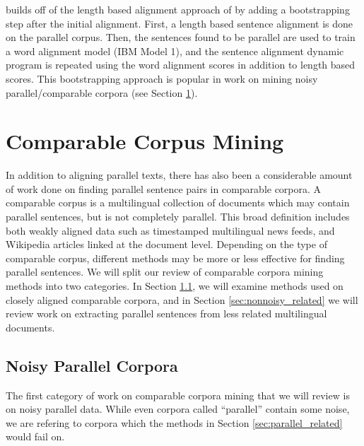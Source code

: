\citet{Moore02} builds off of the length based alignment approach of
\citet{Gale93} by adding a bootstrapping step after the initial alignment.
First, a length based sentence alignment is done on the parallel corpus. Then,
the sentences found to be parallel are used to train a word alignment model
(IBM Model 1), and the sentence alignment dynamic program is repeated using
the word alignment scores in addition to length based scores. This bootstrapping
approach is popular in work on mining noisy parallel/comparable corpora (see
Section \ref{sec:comparable_related}).

\section{Comparable Corpus Mining}
\label{sec:comparable_related}

In addition to aligning parallel texts, there has also been a considerable
amount of work done on finding parallel sentence pairs in comparable corpora. A
comparable corpus is a multilingual collection of documents which may contain
parallel sentences, but is not completely parallel. This broad definition
includes both weakly aligned data such as timestamped multilingual news feeds,
and Wikipedia articles linked at the document level. Depending on the type of
comparable corpus, different methods may be more or less effective for finding
parallel sentences. We will split our review of comparable corpora mining
methods into two categories. In Section \ref{sec:noisy_related}, we will examine
methods used on closely aligned comparable corpora, and in Section
\ref{sec:nonnoisy_related} we will review work on extracting parallel sentences
from less related multilingual documents.

\subsection{Noisy Parallel Corpora}
\label{sec:noisy_related}
The first category of work on comparable corpora mining that we will review is
on noisy parallel data. While even corpora called ``parallel'' contain some
noise, we are refering to corpora which the methods in Section
\ref{sec:parallel_related} would fail on.

